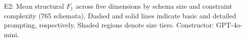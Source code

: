 \caption{E2: Mean structural $F_1$ across five dimensions by schema size and constraint complexity (765 schemata). Dashed and solid lines indicate basic and detailed prompting, respectively. Shaded regions denote size tiers. Constructor: GPT-4o-mini.}
\label{fig:e2_trajectory}
